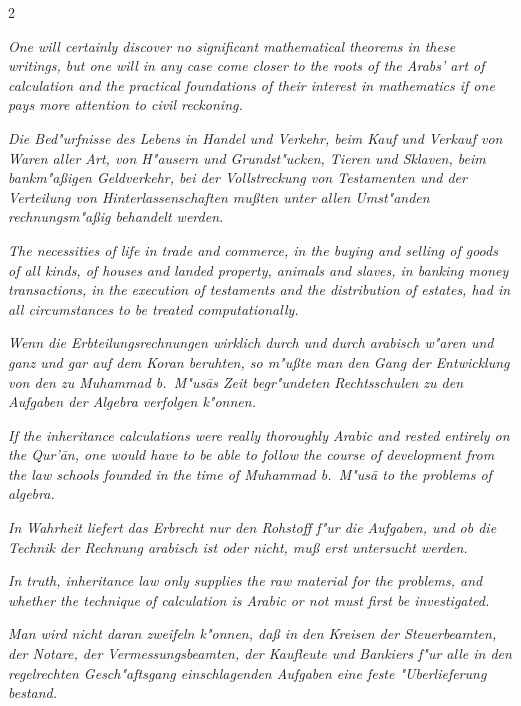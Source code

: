 \documentclass[10pt,a4paper]{article}
\begin{document}
\begin{paracol}{2}
\switchcolumn

\textit{One will certainly discover no significant mathematical theorems in these writings, but one will in any case come closer to the roots of the Arabs' art of calculation and the practical foundations of their interest in mathematics if one pays more attention to civil reckoning.}

\switchcolumn*

\textit{Die Bed"urfnisse des Lebens in Handel und Verkehr, beim Kauf und Verkauf von Waren aller Art, von H"ausern und Grundst"ucken, Tieren und Sklaven, beim bankm"a\ss{}igen Geldverkehr, bei der Vollstreckung von Testamenten und der Verteilung von Hinterlassenschaften mu\ss{}ten unter allen Umst"anden rechnungsm"a\ss{}ig behandelt werden.}

\switchcolumn

\textit{The necessities of life in trade and commerce, in the buying and selling of goods of all kinds, of houses and landed property, animals and slaves, in banking money transactions, in the execution of testaments and the distribution of estates, had in all circumstances to be treated computationally.}

\switchcolumn*

\textit{Wenn die Erbteilungsrechnungen wirklich durch und durch arabisch w"aren und ganz und gar auf dem Koran beruhten, so m"u\ss{}te man den Gang der Entwicklung von den zu Muhammad b.\ M"us\=as Zeit begr"undeten Rechtsschulen zu den Aufgaben der Algebra verfolgen k"onnen.}

\switchcolumn

\textit{If the inheritance calculations were really thoroughly Arabic and rested entirely on the Qur'\=an, one would have to be able to follow the course of development from the law schools founded in the time of Muhammad b.\ M"us\=a to the problems of algebra.}

\switchcolumn*

\textit{In Wahrheit liefert das Erbrecht nur den Rohstoff f"ur die Aufgaben, und ob die Technik der Rechnung arabisch ist oder nicht, mu\ss{} erst untersucht werden.}

\switchcolumn

\textit{In truth, inheritance law only supplies the raw material for the problems, and whether the technique of calculation is Arabic or not must first be investigated.}

\switchcolumn*

\textit{Man wird nicht daran zweifeln k"onnen, da\ss{} in den Kreisen der Steuerbeamten, der Notare, der Vermessungsbeamten, der Kaufleute und Bankiers f"ur alle in den regelrechten Gesch"aftsgang einschlagenden Aufgaben eine feste "Uberlieferung bestand.}


\end{paracol}
\end{document}
